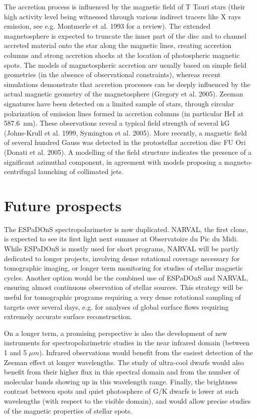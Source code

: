 \documentclass[11pt,twoside]{article}
\begin{document}
The accretion process is influenced by the magnetic field of T Tauri stars (their high activity level being witnessed through various indirect tracers like X rays emission, see e.g. Montmerle et al. 1993 for a review). The extended magnetosphere is expected to truncate the inner part of the disc and to channel accreted material onto the star along the magnetic lines, creating accretion columns and strong accretion shocks at the location of photospheric magnetic spots. The models of magnetospheric accretion are usually based on simple field geometries (in the absence of observational constraints), whereas recent simulations demonstrate that accretion processes can be deeply influenced by the actual magnetic geometry of the magnetosphere (Gregory et al. 2005).  Zeeman signatures have been detected on a limited sample of stars, through circular polarization of emission lines formed in accretion columns (in particular HeI at 587.6~nm). These observations reveal a typical field strength of several kG (Johns-Krull et al. 1999, Symington et al. 2005). More recently, a magnetic field of several hundred Gauss was detected in the protostellar accretion disc FU Ori (Donati et al. 2005). A modelling of the field structure indicates the presence of a significant azimuthal component, in agreement with models proposing a magneto-centrifugal launching of collimated jets.

\section{Future prospects}

The ESPaDOnS spectropolarimeter is now duplicated. NARVAL, the first clone, is expected to see its first light next summer at Observatoire du Pic du Midi. While ESPaDOnS is mostly used for short  programs, NARVAL will be partly dedicated to longer projects, involving dense rotational coverage necessary for tomographic imaging, or longer term monitoring for studies of stellar magnetic cycles. Another option would be the combined use of ESPaDOnS and NARVAL, ensuring almost continuous observation of stellar sources. This strategy will be useful for tomographic programs requiring a very dense rotational sampling of targets over several days, e.g. for analyses of global surface flows requiring extremely accurate surface reconstruction. 

On a longer term, a promising perspective is also the development of new instruments for spectropolarimetric studies in the near infrared domain (between 1 and 5 $\mu m$). Infrared observations would benefit from the easiest detection of the Zeeman effect at longer wavelengths. The study of ultra-cool dwarfs would also benefit from their higher flux in this spectral domain and from the number of molecular bands showing up in this wavelength range. Finally, the brightness contrast between spots and quiet photosphere of G/K dwarfs is lower at such wavelengths (with respect to the visible domain), and would allow precise studies of the magnetic properties of stellar spots. 
\end{document}
